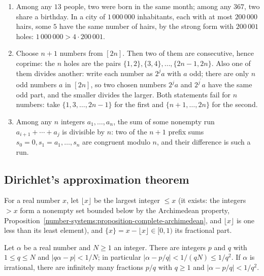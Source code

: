 \begin{example}\label{combinatorics:example-pigeonhole-elementary}
\begin{enumerate}
\item Among any $13$ people, two were born in the same month; among any $367$, two share a birthday. In a city of $1\,000\,000$ inhabitants, each with at most $200\,000$ hairs, some $5$ have the
same number of hairs, by the strong form with $200\,001$ holes: $1\,000\,000 > 4 \cdot 200\,001$.
\item Choose $n + 1$ numbers from $[2n]$. Then two of them are consecutive, hence coprime: the $n$ holes are the pairs $\{1, 2\}, \{3, 4\}, \ldots, \{2n - 1, 2n\}$. Also one of them divides another:
write each number as $2^ja$ with $a$ odd; there are only $n$ odd numbers $a$ in $[2n]$, so two chosen numbers $2^ja$ and $2^{j^{\prime}}a$ have the same odd part, and the smaller divides the larger.
Both statements fail for $n$ numbers: take $\{1, 3, \ldots, 2n - 1\}$ for the first and $\{n + 1, \ldots, 2n\}$ for the second.
\item Among any $n$ integers $a_1, \ldots, a_n$, the sum of some nonempty run $a_{i+1} + \cdots + a_j$ is divisible by $n$: two of the $n + 1$ prefix sums $s_0 = 0, s_1 = a_1, \ldots, s_n$ are congruent
modulo $n$, and their difference is such a run.
\end{enumerate}
\end{example}

\subsection{Dirichlet's approximation theorem}\label{combinatorics:subsection-dirichlet}

For a real number $x$, let $\lfloor x \rfloor$ be the largest integer $\leq x$ (it exists: the integers $> x$ form a nonempty set bounded below by the Archimedean property,
Proposition~\ref{number-systems:proposition-complete-archimedean}, and $\lfloor x \rfloor$ is one less than its least element), and $\{x\} = x - \lfloor x \rfloor \in [0, 1)$ its fractional part.

\begin{theorem}[Dirichlet]\label{combinatorics:theorem-dirichlet-approximation}
Let $\alpha$ be a real number and $N \geq 1$ an integer. There are integers $p$ and $q$ with $1 \leq q \leq N$ and $|q\alpha - p| < 1/N$; in particular $|\alpha - p/q| < 1/(qN) \leq 1/q^2$. If $\alpha$ is
irrational, there are infinitely many fractions $p/q$ with $q \geq 1$ and $|\alpha - p/q| < 1/q^2$.
\end{theorem}

